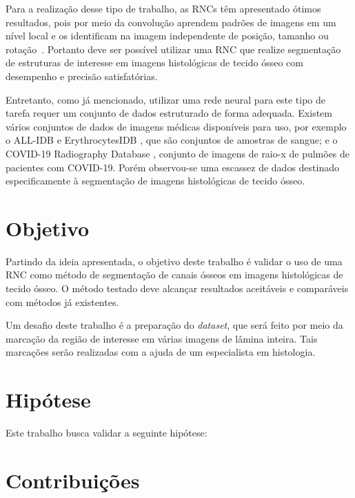     Para a realização desse tipo de trabalho, as \acs{RNC}s têm apresentado ótimos resultados, pois por meio da convolução aprendem padrões de imagens em um nível local e os identificam na imagem independente de posição, tamanho ou rotação~\cite{mueller2019deep}. Portanto deve ser possível utilizar uma \acs{RNC} que realize segmentação de estruturas de interesse em imagens histológicas de tecido ósseo com desempenho e precisão satisfatórias.
    
    Entretanto, como já mencionado, utilizar uma rede neural para este tipo de tarefa requer um conjunto de dados estruturado de forma adequada.
    Existem vários conjuntos de dados de imagens médicas disponíveis para uso, por exemplo o ALL-IDB \cite{Labati2011} e ErythrocytesIDB \cite{Gonzalez-Hidalgo2015}, que são conjuntos de amostras de sangue; e o COVID-19 Radiography Database \cite{Chowdhury2020}, conjunto de imagens de raio-x de pulmões de pacientes com COVID-19. Porém observou-se uma escassez de dados destinado especificamente à segmentação de imagens histológicas de tecido ósseo.
    
\section{Objetivo}

    Partindo da ideia apresentada, o objetivo deste trabalho é validar o uso de uma \ac{RNC} como método de segmentação de canais ósseos em imagens histológicas de tecido ósseo. O método testado deve alcançar resultados aceitáveis e comparáveis com métodos já existentes.
    
    Um desafio deste trabalho é a preparação do \textit{dataset}, que será feito por meio da marcação da região de interesse em várias imagens de lâmina inteira. Tais marcações serão realizadas com a ajuda de um especialista em histologia.

\section{Hipótese}
Este trabalho busca validar a seguinte hipótese: \bigskip

\setlength{\fboxsep}{12pt}
\bigskip

\section{Contribuições}

